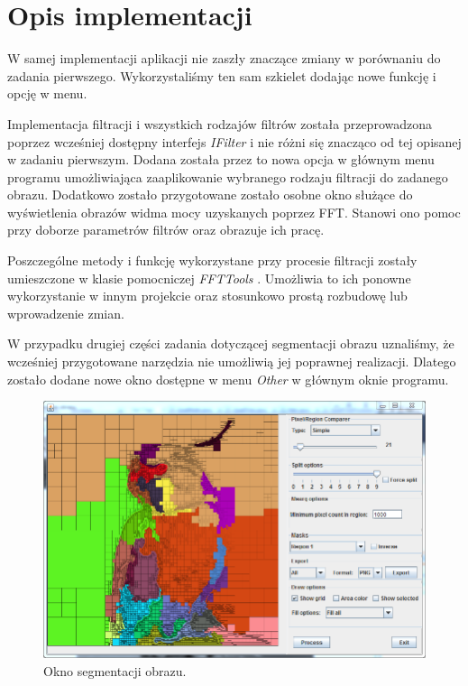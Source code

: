 \documentclass{classrep}
\begin{document}
\section{Opis implementacji}
W samej implementacji aplikacji nie zaszły znaczące zmiany w porównaniu do zadania pierwszego. Wykorzystaliśmy ten sam szkielet dodając nowe funkcję i opcję w menu. 

Implementacja filtracji i wszystkich rodzajów filtrów została przeprowadzona poprzez wcześniej dostępny interfejs \textit{IFilter} i nie różni się znacząco od tej opisanej w zadaniu pierwszym. Dodana została przez to nowa opcja w głównym menu programu umożliwiająca zaaplikowanie wybranego rodzaju filtracji do zadanego obrazu. Dodatkowo zostało przygotowane zostało osobne okno służące do wyświetlenia obrazów widma mocy uzyskanych poprzez FFT. Stanowi ono pomoc przy doborze parametrów filtrów oraz obrazuje ich pracę.

Poszczególne metody i funkcję wykorzystane przy procesie filtracji zostały umieszczone w klasie pomocniczej \textit{FFTTools }. Umożliwia to ich ponowne wykorzystanie w innym projekcie oraz stosunkowo prostą rozbudowę lub wprowadzenie zmian.

W przypadku drugiej części zadania dotyczącej segmentacji obrazu uznaliśmy, że wcześniej przygotowane narzędzia nie umożliwią jej poprawnej realizacji. Dlatego zostało dodane nowe okno dostępne w menu \textit{Other} w głównym oknie programu. 
\begin{figure}[H]
  \centering
  \includegraphics[width=\textwidth]{img/seg/segWindow}
  \caption{Okno segmentacji obrazu.}
  \label{fig_seg_window}
\end{figure}
\end{document}
